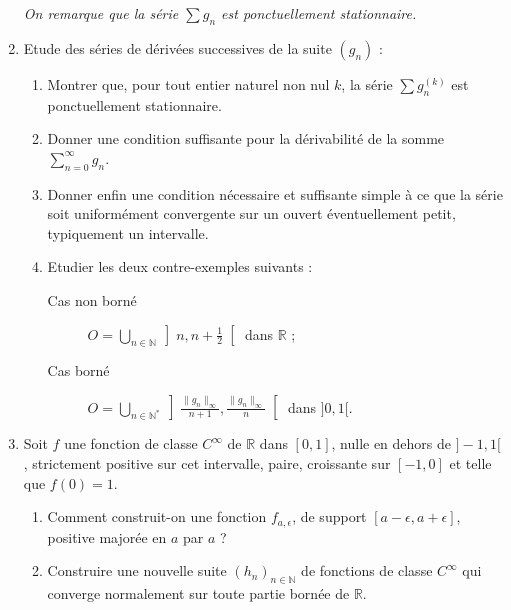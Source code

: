 \begin{exer}
\begin{enumerate}
\emph{On remarque que la s\'erie $\sum g_n$ est \emph{ponctuellement stationnaire}.}
\item Etude des s\'eries de d\'eriv\'ees successives de la suite $(g_n)$ :
\begin{enumerate}
\item Montrer que, pour tout entier naturel non nul $k$, la s\'erie $\sum g_n^{(k)}$ est ponctuellement stationnaire.
\item Donner une condition suffisante pour la d\'erivabilit\'e de la somme $\sum\limits_{n=0}^{\infty}g_n$.
\item Donner enfin une condition n\'ecessaire et suffisante simple à ce que la série soit %
uniform\'ement convergente sur un ouvert \'eventuellement petit, typiquement un intervalle.
\item Etudier les deux contre-exemples suivants :
\begin{description}
\item[Cas non born\'e] $O=\bigcup\limits_{n\in\mathbb{N}}\left]n,n+\frac{1}{2}\right[$ dans $\mathbb{R}$ ;
\item[Cas born\'e] $O=\bigcup\limits_{n \in \mathbb{N}^{\ast}} \left]\frac{\|g_n\|_{\infty}}{n+1},\frac{\|g_n\|_{\infty}}{n}\right[$ dans $]0,1[$.
\end{description}
\end{enumerate}
\item %
Soit $f$ une fonction de classe $C^{\infty}$ de $\mathbb{R}$ dans $[0,1]$, nulle en dehors de $]-1,1[$, %
strictement positive sur cet intervalle, paire, croissante sur $[-1,0]$ et telle que $f(0) = 1$.
\begin{enumerate}
\item Comment construit-on une fonction $f_{a,\epsilon}$, de support $[a-\epsilon ,a+\epsilon]$, positive majorée en $a$ par $a$ ?%
\item Construire une nouvelle suite $(h_n)_{n\in\mathbb{N}}$ de fonctions de classe $C^{\infty}$ qui converge normalement sur toute partie born\'ee de $\mathbb{R}$.

\end{enumerate}
\end{enumerate}
\end{exer}
